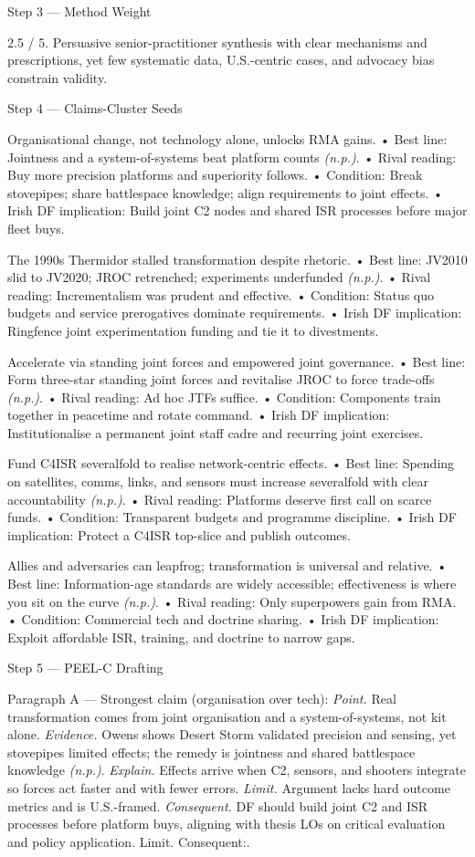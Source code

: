 Step 3 — Method Weight

2.5 / 5. Persuasive senior-practitioner synthesis with clear mechanisms and prescriptions, yet few systematic data, U.S.-centric cases, and advocacy bias constrain validity.

Step 4 — Claims-Cluster Seeds

Organisational change, not technology alone, unlocks RMA gains.
• Best line: Jointness and a system-of-systems beat platform counts \emph{(n.p.)}.
• Rival reading: Buy more precision platforms and superiority follows.
• Condition: Break stovepipes; share battlespace knowledge; align requirements to joint effects.
• Irish DF implication: Build joint C2 nodes and shared ISR processes before major fleet buys.

The 1990s Thermidor stalled transformation despite rhetoric.
• Best line: JV2010 slid to JV2020; JROC retrenched; experiments underfunded \emph{(n.p.)}.
• Rival reading: Incrementalism was prudent and effective.
• Condition: Status quo budgets and service prerogatives dominate requirements.
• Irish DF implication: Ringfence joint experimentation funding and tie it to divestments.

Accelerate via standing joint forces and empowered joint governance.
• Best line: Form three-star standing joint forces and revitalise JROC to force trade-offs \emph{(n.p.)}.
• Rival reading: Ad hoc JTFs suffice.
• Condition: Components train together in peacetime and rotate command.
• Irish DF implication: Institutionalise a permanent joint staff cadre and recurring joint exercises.

Fund C4ISR severalfold to realise network-centric effects.
• Best line: Spending on satellites, comms, links, and sensors must increase severalfold with clear accountability \emph{(n.p.)}.
• Rival reading: Platforms deserve first call on scarce funds.
• Condition: Transparent budgets and programme discipline.
• Irish DF implication: Protect a C4ISR top-slice and publish outcomes.

Allies and adversaries can leapfrog; transformation is universal and relative.
• Best line: Information-age standards are widely accessible; effectiveness is where you sit on the curve \emph{(n.p.)}.
• Rival reading: Only superpowers gain from RMA.
• Condition: Commercial tech and doctrine sharing.
• Irish DF implication: Exploit affordable ISR, training, and doctrine to narrow gaps.

Step 5 — PEEL-C Drafting

Paragraph A — Strongest claim (organisation over tech):
\textit{Point.} Real transformation comes from joint organisation and a system-of-systems, not kit alone.
\textit{Evidence.} Owens shows Desert Storm validated precision and sensing, yet stovepipes limited effects; the remedy is jointness and shared battlespace knowledge \emph{(n.p.)}.
\textit{Explain.} Effects arrive when C2, sensors, and shooters integrate so forces act faster and with fewer errors.
\textit{Limit.} Argument lacks hard outcome metrics and is U.S.-framed.
\textit{Consequent.} DF should build joint C2 and ISR processes before platform buys, aligning with thesis LOs on critical evaluation and policy application. Limit. Consequent:.

